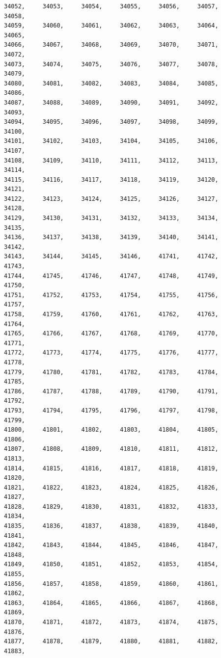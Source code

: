 \documentclass[a4paper,11pt]{report}
\begin{document}
\begin{verbatim}
34052,     34053,     34054,     34055,     34056,     34057,     34058,     
34059,     34060,     34061,     34062,     34063,     34064,     34065,     
34066,     34067,     34068,     34069,     34070,     34071,     34072,     
34073,     34074,     34075,     34076,     34077,     34078,     34079,     
34080,     34081,     34082,     34083,     34084,     34085,     34086,     
34087,     34088,     34089,     34090,     34091,     34092,     34093,     
34094,     34095,     34096,     34097,     34098,     34099,     34100,     
34101,     34102,     34103,     34104,     34105,     34106,     34107,     
34108,     34109,     34110,     34111,     34112,     34113,     34114,     
34115,     34116,     34117,     34118,     34119,     34120,     34121,     
34122,     34123,     34124,     34125,     34126,     34127,     34128,     
34129,     34130,     34131,     34132,     34133,     34134,     34135,     
34136,     34137,     34138,     34139,     34140,     34141,     34142,     
34143,     34144,     34145,     34146,     41741,     41742,     41743,     
41744,     41745,     41746,     41747,     41748,     41749,     41750,     
41751,     41752,     41753,     41754,     41755,     41756,     41757,     
41758,     41759,     41760,     41761,     41762,     41763,     41764,     
41765,     41766,     41767,     41768,     41769,     41770,     41771,     
41772,     41773,     41774,     41775,     41776,     41777,     41778,     
41779,     41780,     41781,     41782,     41783,     41784,     41785,     
41786,     41787,     41788,     41789,     41790,     41791,     41792,     
41793,     41794,     41795,     41796,     41797,     41798,     41799,     
41800,     41801,     41802,     41803,     41804,     41805,     41806,     
41807,     41808,     41809,     41810,     41811,     41812,     41813,     
41814,     41815,     41816,     41817,     41818,     41819,     41820,     
41821,     41822,     41823,     41824,     41825,     41826,     41827,     
41828,     41829,     41830,     41831,     41832,     41833,     41834,     
41835,     41836,     41837,     41838,     41839,     41840,     41841,     
41842,     41843,     41844,     41845,     41846,     41847,     41848,     
41849,     41850,     41851,     41852,     41853,     41854,     41855,     
41856,     41857,     41858,     41859,     41860,     41861,     41862,     
41863,     41864,     41865,     41866,     41867,     41868,     41869,     
41870,     41871,     41872,     41873,     41874,     41875,     41876,     
41877,     41878,     41879,     41880,     41881,     41882,     41883,     

\end{verbatim}
\end{document}
